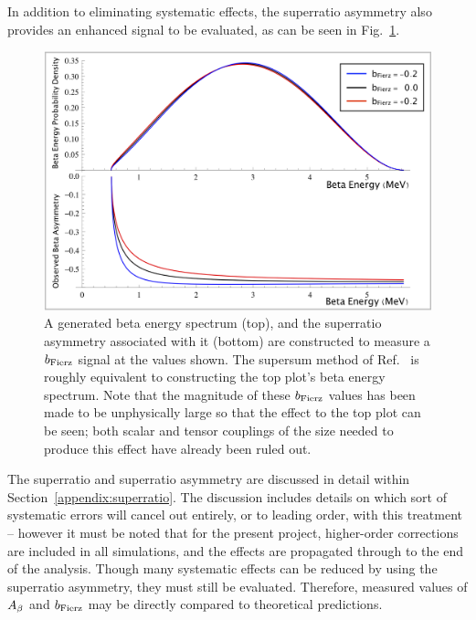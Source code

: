In addition to eliminating systematic effects, the superratio asymmetry also provides an enhanced signal to be evaluated, as can be seen in Fig.~\ref{fig:FierzSignature}.

\begin{figure}[h!!tb]
	\centering
	\includegraphics[width=.999\linewidth]
	{Figures/Fierz_Signature.png}
	\caption[Generated Beta Energy Spectrum and Superratio Asymmetry to Measure $\bFierz$]{A generated beta energy spectrum (top), and the superratio asymmetry associated with it (bottom) are constructed to measure a $\bFierz$ signal at the values shown.  The supersum method of Ref.~\cite{UCNA_first_Fierz} is roughly equivalent to constructing the top plot's beta energy spectrum.  Note that the magnitude of these $\bFierz$ values has been made to be unphysically large so that the effect to the top plot can be seen; both scalar and tensor couplings of the size needed to produce this effect have already been ruled out. }	\label{fig:FierzSignature}
\end{figure}

The superratio and superratio asymmetry are discussed in detail within Section~\ref{appendix:superratio}.  The discussion includes details on which sort of systematic errors will cancel out entirely, or to leading order, with this treatment -- however it must be noted that for the present project, higher-order corrections are included in all simulations, and the effects are propagated through to the end of the analysis.  Though many systematic effects can be reduced by using the superratio asymmetry, they must still be evaluated.  Therefore, measured values of $A_{\beta}$ and $\bFierz$ may be directly compared to theoretical predictions.




